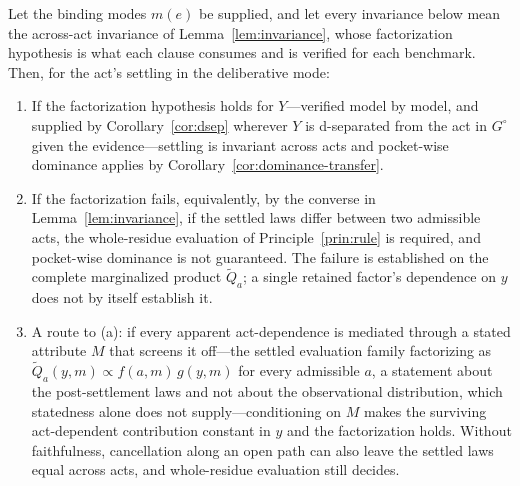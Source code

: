 \begin{theorem}
\label{thm:classification}
Let the binding modes $m(e)$ be supplied, and let every invariance below mean the across-act invariance of Lemma~\ref{lem:invariance}, whose factorization hypothesis is what each clause consumes and is verified for each benchmark. Then, for the act's settling in the deliberative mode:
\begin{enumerate}
\item[(a)] If the factorization hypothesis holds for $Y$---verified model by model, and supplied by Corollary~\ref{cor:dsep} wherever $Y$ is d-separated from the act in $G^{\circ}$ given the evidence---settling is invariant across acts and pocket-wise dominance applies by Corollary~\ref{cor:dominance-transfer}.
\item[(b)] If the factorization fails, equivalently, by the converse in Lemma~\ref{lem:invariance}, if the settled laws differ between two admissible acts, the whole-residue evaluation of Principle~\ref{prin:rule} is required, and pocket-wise dominance is not guaranteed. The failure is established on the complete marginalized product $\widetilde Q_a$; a single retained factor's dependence on $y$ does not by itself establish it.
\item[(c)] A route to (a): if every apparent act-dependence is mediated through a stated attribute $M$ that screens it off---the settled evaluation family factorizing as $\widetilde Q_a(y, m) \propto f(a, m)\, g(y, m)$ for every admissible $a$, a statement about the post-settlement laws and not about the observational distribution, which statedness alone does not supply---conditioning on $M$ makes the surviving act-dependent contribution constant in $y$ and the factorization holds. Without faithfulness, cancellation along an open path can also leave the settled laws equal across acts, and whole-residue evaluation still decides.
\end{enumerate}

\end{theorem}
